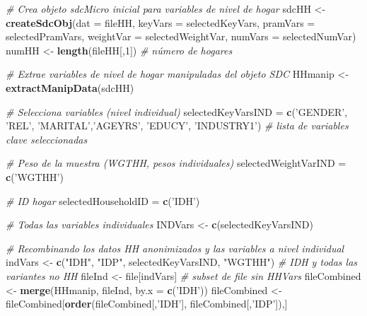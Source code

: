\documentclass[]{book}
\newenvironment{Shaded}{\begin{snugshade}}{\end{snugshade}}
\newcommand{\CommentTok}[1]{\textcolor[rgb]{0.56,0.35,0.01}{\textit{#1}}}
\newcommand{\DataTypeTok}[1]{\textcolor[rgb]{0.13,0.29,0.53}{#1}}
\newcommand{\DecValTok}[1]{\textcolor[rgb]{0.00,0.00,0.81}{#1}}
\newcommand{\KeywordTok}[1]{\textcolor[rgb]{0.13,0.29,0.53}{\textbf{#1}}}
\newcommand{\NormalTok}[1]{#1}
\newcommand{\StringTok}[1]{\textcolor[rgb]{0.31,0.60,0.02}{#1}}
\theoremstyle{definition}
\theoremstyle{definition}
\theoremstyle{definition}
\theoremstyle{definition}
\theoremstyle{remark}
\begin{document}
\begin{Shaded}
\begin{Highlighting}[]
\CommentTok{# Crea objeto sdcMicro inicial para variables de nivel de hogar}
\NormalTok{sdcHH <-}\StringTok{ }\KeywordTok{createSdcObj}\NormalTok{(}\DataTypeTok{dat =}\NormalTok{ fileHH, }\DataTypeTok{keyVars =}\NormalTok{ selectedKeyVars,}
                      \DataTypeTok{pramVars =}\NormalTok{ selectedPramVars, }\DataTypeTok{weightVar =}\NormalTok{ selectedWeightVar,}
                      \DataTypeTok{numVars =}\NormalTok{ selectedNumVar)}
\NormalTok{numHH <-}\StringTok{ }\KeywordTok{length}\NormalTok{(fileHH[,}\DecValTok{1}\NormalTok{]) }\CommentTok{# número de hogares}

\CommentTok{# Extrae variables de nivel de hogar manipuladas del objeto SDC}
\NormalTok{HHmanip <-}\StringTok{ }\KeywordTok{extractManipData}\NormalTok{(sdcHH)}

\CommentTok{# Selecciona variables (nivel individual)}
\NormalTok{selectedKeyVarsIND =}\StringTok{ }\KeywordTok{c}\NormalTok{(}\StringTok{'GENDER'}\NormalTok{, }\StringTok{'REL'}\NormalTok{, }\StringTok{'MARITAL'}\NormalTok{,}\StringTok{'AGEYRS'}\NormalTok{,}
                       \StringTok{'EDUCY'}\NormalTok{, }\StringTok{'INDUSTRY1'}\NormalTok{) }\CommentTok{# lista de variables clave seleccionadas}

\CommentTok{# Peso de la muestra (WGTHH, pesos individuales)}
\NormalTok{selectedWeightVarIND =}\StringTok{ }\KeywordTok{c}\NormalTok{(}\StringTok{'WGTHH'}\NormalTok{)}

\CommentTok{# ID hogar}
\NormalTok{selectedHouseholdID =}\StringTok{ }\KeywordTok{c}\NormalTok{(}\StringTok{'IDH'}\NormalTok{)}

\CommentTok{# Todas las variables individuales}
\NormalTok{INDVars <-}\StringTok{ }\KeywordTok{c}\NormalTok{(selectedKeyVarsIND)}

\CommentTok{# Recombinando los datos HH anonimizados y las variables a nivel individual}
\NormalTok{indVars <-}\StringTok{ }\KeywordTok{c}\NormalTok{(}\StringTok{"IDH"}\NormalTok{, }\StringTok{"IDP"}\NormalTok{, selectedKeyVarsIND, }\StringTok{"WGTHH"}\NormalTok{) }\CommentTok{# IDH y todas las variantes no HH}
\NormalTok{fileInd <-}\StringTok{ }\NormalTok{file[indVars] }\CommentTok{# subset de file sin HHVars}
\NormalTok{fileCombined <-}\StringTok{ }\KeywordTok{merge}\NormalTok{(HHmanip, fileInd, }\DataTypeTok{by.x =} \KeywordTok{c}\NormalTok{(}\StringTok{'IDH'}\NormalTok{))}
\NormalTok{fileCombined <-}\StringTok{ }\NormalTok{fileCombined[}\KeywordTok{order}\NormalTok{(fileCombined[,}\StringTok{'IDH'}\NormalTok{],  fileCombined[,}\StringTok{'IDP'}\NormalTok{]),]}


\end{Highlighting}
\end{Shaded}
\end{document}
